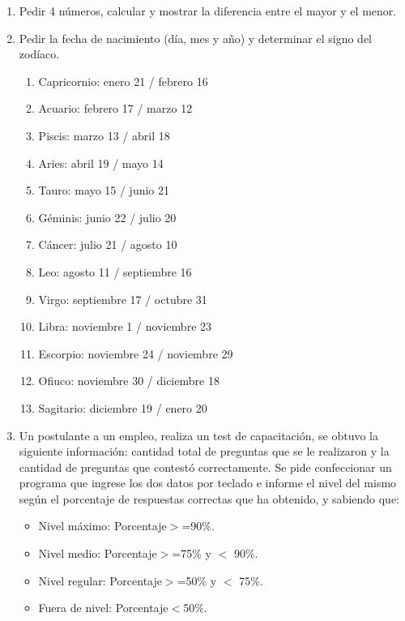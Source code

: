 \begin{enumerate}[resume]
  \item Pedir 4 números, calcular y mostrar la diferencia entre el mayor y el
    menor.

  \item Pedir la fecha de nacimiento (día, mes y año) y determinar el signo del
    zodíaco.
    \begin{enumerate}
      \item Capricornio: enero 21 / febrero 16
      \item Acuario: febrero 17 / marzo 12
      \item Piscis: marzo 13 / abril 18
      \item Aries: abril 19 / mayo 14
      \item Tauro: mayo 15 / junio 21
      \item Géminis: junio 22 / julio 20
      \item Cáncer: julio 21 / agosto 10
      \item Leo: agosto 11 / septiembre 16
      \item Virgo: septiembre 17 / octubre 31
      \item Libra: noviembre 1 / noviembre 23
      \item Escorpio: noviembre 24 / noviembre 29
      \item Ofiuco: noviembre 30 / diciembre 18
      \item Sagitario: diciembre 19 / enero 20
    \end{enumerate}

  \item Un postulante a un empleo, realiza un test de capacitación, se obtuvo
    la siguiente información: cantidad total de preguntas que se le realizaron
    y la cantidad de preguntas que contestó correctamente. Se pide confeccionar
    un programa que ingrese los dos datos por teclado e informe el nivel del
    mismo según el porcentaje de respuestas correctas que ha obtenido, y
    sabiendo que:
      \begin{itemize}
        \item Nivel máximo:              Porcentaje$>$=90\%.
        \item Nivel medio:               Porcentaje$>$=75\% y $<$ 90\%.
        \item Nivel regular:             Porcentaje$>$=50\% y  $<$ 75\%.
        \item Fuera de nivel:            Porcentaje$<$50\%.
      \end{itemize}


\end{enumerate}
